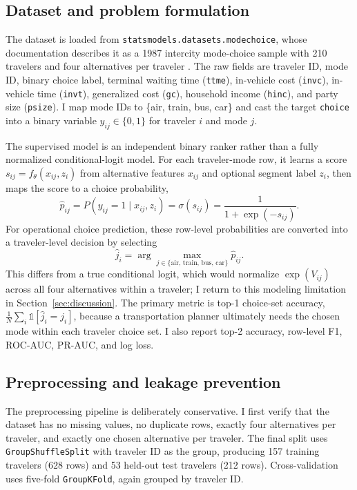 \documentclass{article}
\begin{document}
\subsection{Dataset and problem formulation}
The dataset is loaded from \texttt{statsmodels.datasets.modechoice}, whose documentation describes it as a 1987 intercity mode-choice sample with 210 travelers and four alternatives per traveler \citep{statsmodels_modechoice}.  The raw fields are traveler ID, mode ID, binary choice label, terminal waiting time (\texttt{ttme}), in-vehicle cost (\texttt{invc}), in-vehicle time (\texttt{invt}), generalized cost (\texttt{gc}), household income (\texttt{hinc}), and party size (\texttt{psize}).  I map mode IDs to \{air, train, bus, car\} and cast the target \texttt{choice} into a binary variable $y_{ij}\in\{0,1\}$ for traveler $i$ and mode $j$.

The supervised model is an independent binary ranker rather than a fully normalized conditional-logit model.  For each traveler-mode row, it learns a score $s_{ij}=f_\theta(x_{ij}, z_i)$ from alternative features $x_{ij}$ and optional segment label $z_i$, then maps the score to a choice probability,
\begin{equation}
\hat{p}_{ij}=P(y_{ij}=1\mid x_{ij},z_i)=\sigma(s_{ij})=\frac{1}{1+\exp(-s_{ij})}.
\end{equation}
For operational choice prediction, these row-level probabilities are converted into a traveler-level decision by selecting
\begin{equation}
\hat{j}_i = \arg\max_{j\in\{\text{air, train, bus, car}\}} \hat{p}_{ij}.
\end{equation}
This differs from a true conditional logit, which would normalize $\exp(V_{ij})$ across all four alternatives within a traveler; I return to this modeling limitation in Section~\ref{sec:discussion}.  The primary metric is top-1 choice-set accuracy, $\frac{1}{N}\sum_i \mathbb{1}[\hat{j}_i=j_i]$, because a transportation planner ultimately needs the chosen mode within each traveler choice set.  I also report top-2 accuracy, row-level F1, ROC-AUC, PR-AUC, and log loss.

\subsection{Preprocessing and leakage prevention}
The preprocessing pipeline is deliberately conservative.  I first verify that the dataset has no missing values, no duplicate rows, exactly four alternatives per traveler, and exactly one chosen alternative per traveler.  The final split uses \texttt{GroupShuffleSplit} with traveler ID as the group, producing 157 training travelers (628 rows) and 53 held-out test travelers (212 rows).  Cross-validation uses five-fold \texttt{GroupKFold}, again grouped by traveler ID.
\end{document}

